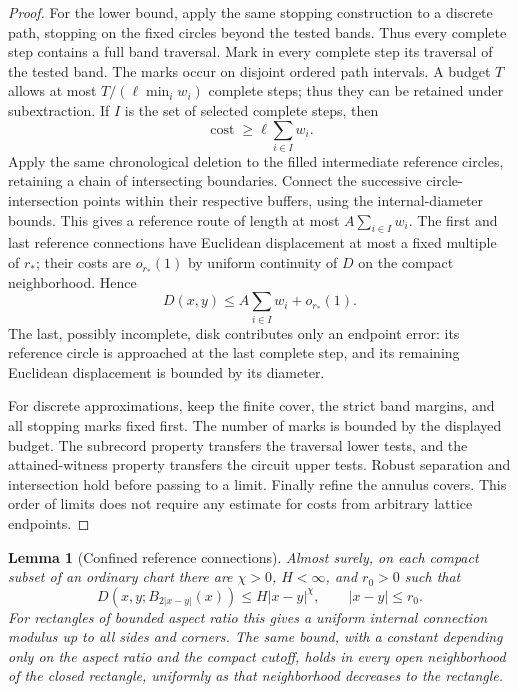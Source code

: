 \documentclass[11pt]{article}
\numberwithin{equation}{section}
\newtheorem{lemma}[theorem]{Lemma}
\theoremstyle{definition}
\theoremstyle{remark}
\newcommand{\1}{\mathbf 1}
\begin{document}
\begin{proof}
For the lower bound, apply the same stopping construction to a discrete
path, stopping on the fixed circles beyond the tested bands.  Thus
every complete step contains a full band traversal.  Mark in every complete
step its traversal of the tested band.  The marks occur on disjoint
ordered path intervals.  A budget $T$ allows at most
$T/(\ell\min_i w_i)$ complete steps; thus they can be retained under
subextraction.  If $I$ is the set of selected complete steps, then
\[
 \operatorname{cost}\geq \ell\sum_{i\in I}w_i.
\]
Apply the same chronological deletion to the filled intermediate
reference circles, retaining a chain of intersecting boundaries.
Connect the successive circle-intersection points within their
respective buffers, using the internal-diameter bounds.  This gives
a reference route of length at most
$A\sum_{i\in I}w_i$.  The first and last reference connections have
Euclidean displacement at most a fixed multiple of $r_*$; their costs
are $o_{r_*}(1)$ by uniform continuity of $D$ on the compact
neighborhood.  Hence
\[
 D(x,y)\leq A\sum_{i\in I}w_i+o_{r_*}(1).
\]
The last, possibly incomplete, disk contributes only an endpoint error:
its reference circle is approached at the last complete step, and its
remaining Euclidean displacement is bounded by its diameter.

For discrete approximations, keep the finite cover, the strict band
margins, and all stopping marks fixed first.  The number of marks is
bounded by the displayed budget.  The subrecord property transfers the
traversal lower tests, and the attained-witness property transfers the
circuit upper tests.  Robust separation and intersection hold before
passing to a limit.  Finally refine the annulus covers.  This order of
limits does not require any estimate for costs from arbitrary lattice
endpoints.
\end{proof}

\begin{lemma}[Confined reference connections]
\label{met:rect-access}
Almost surely, on each compact subset of an ordinary chart there are
$\chi>0$, $H<\infty$, and $r_0>0$ such that
\begin{equation}
 D(x,y;B_{2|x-y|}(x))\leq H|x-y|^\chi,
 \qquad |x-y|\leq r_0.
 \label{met:internal-holder}
\end{equation}
For rectangles of bounded aspect ratio this gives a uniform internal
connection modulus up to all sides and corners.  The same bound, with a
constant depending only on the aspect ratio and the compact cutoff,
holds in every open neighborhood of the closed rectangle, uniformly as
that neighborhood decreases to the rectangle.
\end{lemma}
\end{document}
